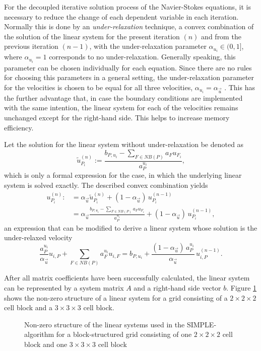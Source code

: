 For the decoupled iterative solution process of the Navier-Stokes equations, it is necessary to reduce the change of each dependent variable in each iteration. Normally this is done by an \emph{under-relaxation} technique, a convex combination of the solution of the linear system for the present iteration \((n)\) and from the previous iteration \((n-1)\), with the under-relaxation parameter \(\alpha_{u_i} \in (0,1]\), where \(\alpha_{u_i} = 1\) corresponds to no under-relaxation. Generally speaking, this parameter can be chosen individually for each equation. Since there are no rules for choosing this parameters in a general setting, the under-relaxation parameter for the velocities is chosen to be equal for all three velocities, \(\alpha_{u_i} = \alpha_{\vec{u}}\) \cite{schaefer99}. This has the further advantage that, in case the boundary conditions are implemented with the same intention, the linear system for each of the velocities remains unchanged except for the right-hand side. This helps to increase memory efficiency.

Let the solution for the linear system without under-relaxation be denoted as
\begin{displaymath}
  \tilde{u}_{P_i}^{(n)} := \frac{b_{P,u_i} - \sum_{F \in NB(P)} a_F u_{F_i}}{a_P^{u_i}},
\end{displaymath}
which is only a formal expression for the case, in which the underlying linear system is solved exactly. The described convex combination yields
\begin{align*}
  u_{P_i}^{(n)} :&= \alpha_{\vec{u}} \tilde{u}_{P_i}^{(n)} + (1 - \alpha_{\vec{u}} )\, u_{P_i}^{(n-1)} \\[0.5em]
                 &= \alpha_{\vec{u}} \frac{b_{P,u_i} - \sum_{F \in NB(P)} a_F u_{F_i}}{a_P^{u_i}} + (1 - \alpha_{\vec{u}} )\, u_{P_i}^{(n-1)},
\end{align*}
an expression that can be modified to derive a linear system whose solution is the under-relaxed velocity
\begin{displaymath}
  \frac{a_P^{u_i}}{\alpha_{\vec{u}}} u_{i,P} + \sum_{F \in NB(P)} a_F^{u_i} u_{i,F} 
  = 
  b_{P,u_i} + \frac{(1 - \alpha_{\vec{u}})\, a_P^{u_i}}{\alpha_{\vec{u}}}\, u_{i,P}^{(n-1)}. 
\end{displaymath}

After all matrix coefficients have been successfully calculated, the linear system can be represented by a system matrix \(A\) and a right-hand side vector \(b\). Figure \ref{fig:segassemble} shows the non-zero structure of a linear system for a grid consisting of a \(2\times2\times2\) cell block and a \(3\times3\times3\) cell block.

\begin{figure}
  \centering
  
  \caption{Non-zero structure of the linear systems used in the SIMPLE-algorithm for a block-structured grid consisting of one $2\times2\times2$ cell block and one $3\times3\times3$ cell block}
  \label{fig:segassemble}
\end{figure}

